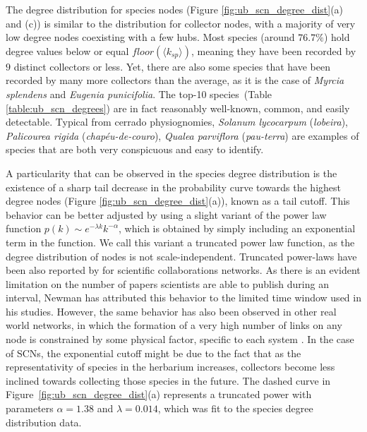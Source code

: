 The degree distribution for species nodes (Figure \ref{fig:ub_scn_degree_dist}(a) and (c)) is similar to the distribution for collector nodes, with a majority of very low degree nodes coexisting with a few hubs.
Most species (around $76.7\%$) hold degree values below or equal $floor(\langle k_{sp}\rangle)$, meaning they have been recorded by $9$ distinct collectors or less.
Yet, there are also some species that have been recorded by many more collectors than the average, as it is the case of \textit{Myrcia splendens} and \textit{Eugenia punicifolia}. The top-10 species~(Table \ref{table:ub_scn_degrees}) are in fact reasonably well-known, common, and easily detectable. Typical from cerrado physiognomies, \textit{Solanum lycocarpum} (\textit{lobeira}), \textit{Palicourea rigida} (\textit{chapéu-de-couro}), \textit{Qualea parviflora} (\textit{pau-terra}) are examples of species that are both very conspicuous and easy to identify.

A particularity that can be observed in the species degree distribution is the existence of a sharp tail decrease in the probability curve towards the highest degree nodes (Figure \ref{fig:ub_scn_degree_dist}(a)), known as a tail cutoff.
This behavior can be better adjusted by using a slight variant of the power law function $p(k) \sim e^{-\lambda k} k^{-\alpha}$, which is obtained by simply including an exponential term in the function. We call this variant a truncated power law function, as the degree distribution of nodes is not scale-independent.
Truncated power-laws have been also reported by  for scientific collaborations networks. 
As there is an evident limitation on the number of papers scientists are able to publish during an interval, Newman has attributed this behavior to the limited time window used in his studies. 
However, the same behavior has also been observed in other real world networks, in which the formation of a very high number of links on any node is constrained by some physical factor, specific to each system \cite{Albert2002}. 
In the case of SCNs, the exponential cutoff might be due to the fact that as the representativity of species in the herbarium increases, collectors become less inclined towards collecting those species in the future. 
The dashed curve in Figure~\ref{fig:ub_scn_degree_dist}(a) represents a truncated power with parameters $\alpha=1.38$ and $\lambda =0.014$, which was fit to the species degree distribution data.

